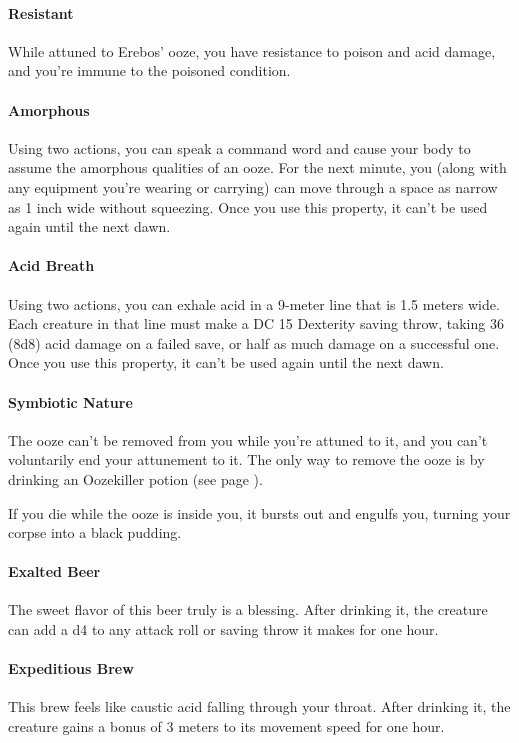     \paragraph{Resistant} While attuned to Erebos' ooze, you have resistance to poison and acid damage, and you're immune to the poisoned condition.
    \paragraph{Amorphous} Using two actions, you can speak a command word and cause your body to assume the amorphous qualities of an ooze.
    For the next minute, you (along with any equipment you're wearing or carrying) can move through a space as narrow as 1 inch wide without squeezing.
    Once you use this property, it can't be used again until the next dawn.
    \paragraph{Acid Breath} Using two actions, you can exhale acid in a 9-meter line that is 1.5 meters wide.
    Each creature in that line must make a DC 15 Dexterity saving throw, taking 36 (8d8) acid damage on a failed save, or half as much damage on a successful one.
    Once you use this property, it can't be used again until the next dawn.
    \paragraph{Symbiotic Nature} The ooze can't be removed from you while you're attuned to it, and you can't voluntarily end your attunement to it.
    The only way to remove the ooze is by drinking an Oozekiller potion (see page \pageref{item::oozekiller}).

    If you die while the ooze is inside you, it bursts out and engulfs you, turning your corpse into a black pudding.
\paragraph{Exalted Beer} %
    The sweet flavor of this beer truly is a blessing.
    After drinking it, the creature can add a d4 to any attack roll or saving throw it makes for one hour.
\paragraph{Expeditious Brew} %
    This brew feels like caustic acid falling through your throat.
    After drinking it, the creature gains a bonus of 3 meters to its movement speed for one hour.
